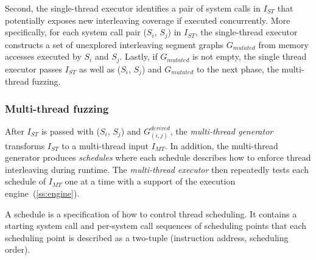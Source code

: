 Second, the single-thread executor identifies a pair of system calls
in $I_{ST}$ that potentially exposes new interleaving coverage if
executed concurrently.
%
More specifically, for each system call pair ($S_i$, $S_j$) in
$I_{ST}$, the single-thread executor constructs a set of unexplored
interleaving segment graphs $G_{mutated}$ from memory accesses
executed by $S_i$ and $S_j$.
%
Lastly, if $G_{mutated}$ is not empty, the single thread executor
passes $I_{ST}$ as well as ($S_i$, $S_j$) and $G_{mutated}$ to the
next phase, the multi-thread fuzzing.


%







\subsubsection{Multi-thread fuzzing}
\label{sss:multithreadfuzzing}
%
After $I_{ST}$ is passed with ($S_i$, $S_j$) and
$G^{derived}_{(i,j)}$, the \textit{multi-thread generator} transforms
$I_{ST}$ to a multi-thread input $I_{MT}$.
%
In addition, the multi-thread generator produces \textit{schedules}
where each schedule describes how to enforce thread interleaving
during runtime.
%
The \textit{multi-thread executor} then repeatedly tests each schedule
of $I_{MT}$ one at a time with a support of the execution
engine~(\autoref{ss:engine}).


%
A schedule is a specification of how to control thread scheduling.
%
It contains a starting system call and per-system call sequences of
scheduling points that each scheduling point is described as a
two-tuple (instruction address, scheduling order).

